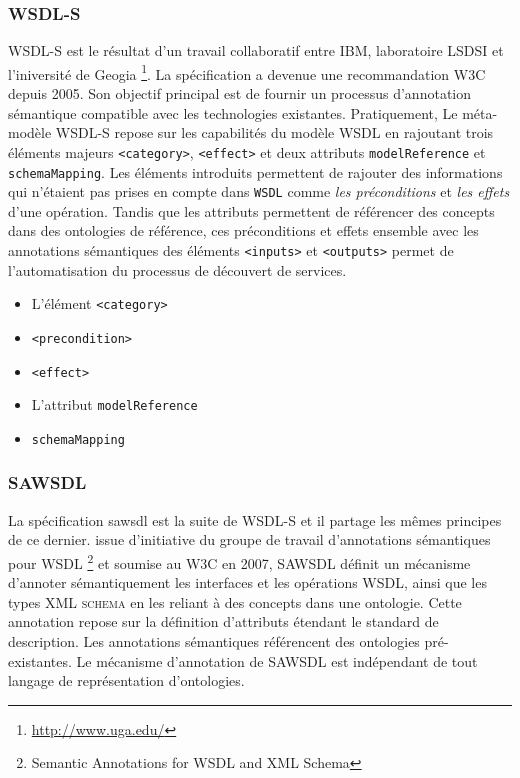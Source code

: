     \subsubsection{WSDL-S}
    \textsc{WSDL-S} \cite{akkiraju2005web} est le résultat d'un
    travail collaboratif entre IBM, laboratoire LSDSI et l'iniversité
    de Geogia \footnote{\url{http://www.uga.edu/}}.  La spécification
    a devenue une recommandation \textsc{W3C} depuis 2005. Son
    objectif principal est de fournir un processus d'annotation
    sémantique compatible avec les technologies
    existantes. Pratiquement, Le méta-modèle \textsc{WSDL-S} repose
    sur les capabilités du modèle \textsc{WSDL} en rajoutant trois
    éléments majeurs \texttt{<category>}, \texttt{<effect>} et deux
    attributs \texttt{modelReference} et \texttt{schemaMapping}. Les
    éléments introduits permettent de rajouter des informations qui
    n'étaient pas prises en compte dans \texttt{WSDL} comme \emph{les
      préconditions} et \emph{les effets} d'une opération. Tandis que
    les attributs permettent de référencer des concepts dans des
    ontologies de référence, ces préconditions et effets ensemble avec
    les annotations sémantiques des éléments \texttt{<inputs>} et
    \texttt{<outputs>} permet de l'automatisation du processus de
    découvert de services.


    \begin{itemize} %
    \item L'élément \texttt{<category>}
    \item \texttt{<precondition>}
    \item \texttt{<effect>}
    \item L'attribut \texttt{modelReference}
    \item \texttt{schemaMapping}
    \end{itemize}

    \subsubsection{SAWSDL}
    La spécification \acrshort{sawsdl} \cite{kopecky2007sawsdl} est la
    suite de \textsc{WSDL-S} et il partage les mêmes principes de ce
    dernier. issue d'initiative du groupe de travail d'annotations
    sémantiques pour \textsc{WSDL} \footnote{Semantic Annotations for
      WSDL and XML Schema} et soumise au \textsc{W3C} en 2007,
    \textsc{SAWSDL} définit un mécanisme d'annoter sémantiquement les
    interfaces et les opérations \textsc{WSDL}, ainsi que les types
    \textsc{XML schema} en les reliant à des concepts dans une
    ontologie.  Cette annotation repose sur la définition d'attributs
    étendant le standard de description.  Les annotations sémantiques
    référencent des ontologies pré-existantes. Le mécanisme
    d'annotation de \textsc{SAWSDL} est indépendant de tout langage de
    représentation \cite{lopez2008selection} d'ontologies.

